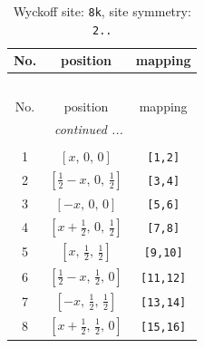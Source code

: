 \documentclass[fleqn,8pt]{jsarticle}
\begin{document}
\begin{longtable}{ccc}
\caption{Wyckoff site: {\tt 8k}, site symmetry: {\tt 2..}}
 \\
 \hline \hline
No. & position & mapping \\ \hline \endfirsthead

\multicolumn{2}{l}{\tablename\ \thetable{}} \\
 \hline \hline
No. & position & mapping \\ \hline \endhead

 \hline \hline
\multicolumn{2}{r}{\footnotesize\it continued ...} \\ \endfoot

 \hline \hline
\multicolumn{2}{r}{} \\ \endlastfoot

1 & $\left[ x,\, 0,\, 0 \right]$ & {\tt [1,2]} \\ \hline
2 & $\left[ \frac{1}{2} - x,\, 0,\, \frac{1}{2} \right]$ & {\tt [3,4]} \\ \hline
3 & $\left[ - x,\, 0,\, 0 \right]$ & {\tt [5,6]} \\ \hline
4 & $\left[ x + \frac{1}{2},\, 0,\, \frac{1}{2} \right]$ & {\tt [7,8]} \\ \hline
5 & $\left[ x,\, \frac{1}{2},\, \frac{1}{2} \right]$ & {\tt [9,10]} \\ \hline
6 & $\left[ \frac{1}{2} - x,\, \frac{1}{2},\, 0 \right]$ & {\tt [11,12]} \\ \hline
7 & $\left[ - x,\, \frac{1}{2},\, \frac{1}{2} \right]$ & {\tt [13,14]} \\ \hline
8 & $\left[ x + \frac{1}{2},\, \frac{1}{2},\, 0 \right]$ & {\tt [15,16]} \\
\end{longtable}
\renewcommand{\arraystretch}{1.2}
\end{document}
